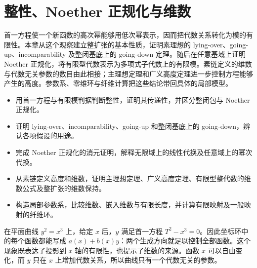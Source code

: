
% 
% 

\chapter{整性、Noether 正规化与维数}
\label{g5:ch:03}

\begin{chapterabstract}
	首一方程使一个新函数的高次幂能够用低次幂表示，因而把代数关系转化为模的有限性。本章从这个观察建立整扩张的基本性质，证明素理想的 lying-over、going-up、incomparability 及整闭基底上的 going-down 定理。随后在任意基域上证明 Noether 正规化，将有限型代数表示为多项式子代数上的有限模。素链定义的维数与代数无关参数的数目由此相接；主理想定理和广义高度定理进一步控制方程能够产生的高度。参数系、零维环与纤维计算把这些结论带回具体的局部模型。
\end{chapterabstract}

\begin{learninggoals}
	\begin{itemize}
		\item 用首一方程与有限模判据判断整性，证明其传递性，并区分整闭包与 Noether 正规化。
		\item 证明 lying-over、incomparability、going-up 和整闭基底上的 going-down，辨认各项假设的用途。
		\item 完成 Noether 正规化的消元证明，解释无限域上的线性代换及任意域上的幂次代换。
		\item 从素链定义高度和维数，证明主理想定理、广义高度定理、有限型整代数的维数公式及整扩张的维数保持。
		\item 构造局部参数系，比较维数、嵌入维数与有限长度，并计算有限映射及一般映射的纤维环。
	\end{itemize}
\end{learninggoals}

在平面曲线 \(y^2=x^3\) 上，给定 \(x\) 后，\(y\) 满足首一方程 \(T^2-x^3=0\)。因此坐标环中的每个函数都能写成 \(a(x)+b(x)y\)：两个生成方向就足以控制全部函数。这个现象既表达了投影到 \(x\) 轴的有限性，也提示了维数的来源。函数 \(x\) 可以自由变化，而 \(y\) 只在 \(x\) 上增加代数关系，所以曲线只有一个代数无关的参数。

\ProseParagraphBreak

